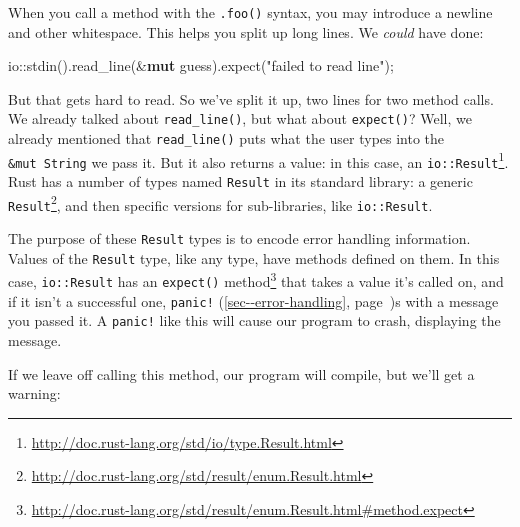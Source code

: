 \documentclass[a4paper,]{book}
\renewcommand*{\hyperlink}[2]{%
 #2 (\autoref{#1}, page~\pageref{#1})}
\newenvironment{Shaded}{\begin{snugshade}}{\end{snugshade}}
\newcommand{\KeywordTok}[1]{\textcolor[rgb]{0.13,0.29,0.53}{\textbf{{#1}}}}
\newcommand{\StringTok}[1]{\textcolor[rgb]{0.31,0.60,0.02}{{#1}}}
\newcommand{\CommentTok}[1]{\textcolor[rgb]{0.56,0.35,0.01}{\textit{{#1}}}}
\newcommand{\NormalTok}[1]{{#1}}
\renewcommand{\href}[2]{#2\footnote{\url{#1}}}
\begin{document}
When you call a method with the \texttt{.foo()} syntax, you may
introduce a newline and other whitespace. This helps you split up long
lines. We \emph{could} have done:

\begin{Shaded}
\begin{Highlighting}[]
    \NormalTok{io::stdin().read_line(&}\KeywordTok{mut} \NormalTok{guess).expect(}\StringTok{"failed to read line"}\NormalTok{);}
\end{Highlighting}
\end{Shaded}

But that gets hard to read. So we've split it up, two lines for two
method calls. We already talked about \texttt{read\_line()}, but what
about \texttt{expect()}? Well, we already mentioned that
\texttt{read\_line()} puts what the user types into the
\texttt{\&mut\ String} we pass it. But it also returns a value: in this
case, an
\href{http://doc.rust-lang.org/std/io/type.Result.html}{\texttt{io::Result}}.
Rust has a number of types named \texttt{Result} in its standard
library: a generic
\href{http://doc.rust-lang.org/std/result/enum.Result.html}{\texttt{Result}},
and then specific versions for sub-libraries, like \texttt{io::Result}.

The purpose of these \texttt{Result} types is to encode error handling
information. Values of the \texttt{Result} type, like any type, have
methods defined on them. In this case, \texttt{io::Result} has an
\href{http://doc.rust-lang.org/std/result/enum.Result.html\#method.expect}{\texttt{expect()}
method} that takes a value it's called on, and if it isn't a successful
one, \protect\hyperlink{sec--error-handling}{\texttt{panic!}}s with a
message you passed it. A \texttt{panic!} like this will cause our
program to crash, displaying the message.

If we leave off calling this method, our program will compile, but we'll
get a warning:

\begin{Shaded}
\end{Shaded}
\end{document}
